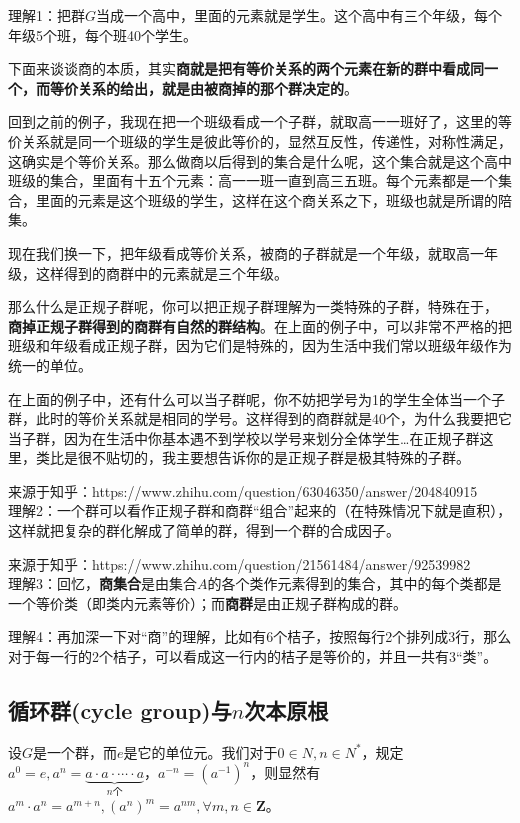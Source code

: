 \documentclass[12pt]{article}
\begin{document}
\begin{framed}
\small {
理解1：把群$G$当成一个高中，里面的元素就是学生。这个高中有三个年级，每个年级5个班，每个班40个学生。

下面来谈谈商的本质，其实\textbf{商就是把有等价关系的两个元素在新的群中看成同一个，而等价关系的给出，就是由被商掉的那个群决定的}。

回到之前的例子，我现在把一个班级看成一个子群，就取高一一班好了，这里的等价关系就是同一个班级的学生是彼此等价的，显然互反性，传递性，对称性满足，这确实是个等价关系。那么做商以后得到的集合是什么呢，这个集合就是这个高中班级的集合，里面有十五个元素：高一一班一直到高三五班。每个元素都是一个集合，里面的元素是这个班级的学生，这样在这个商关系之下，班级也就是所谓的陪集。

现在我们换一下，把年级看成等价关系，被商的子群就是一个年级，就取高一年级，这样得到的商群中的元素就是三个年级。

那么什么是正规子群呢，你可以把正规子群理解为一类特殊的子群，特殊在于，
\textbf{商掉正规子群得到的商群有自然的群结构}。在上面的例子中，可以非常不严格的把班级和年级看成正规子群，因为它们是特殊的，因为生活中我们常以班级年级作为统一的单位。

在上面的例子中，还有什么可以当子群呢，你不妨把学号为1的学生全体当一个子群，此时的等价关系就是相同的学号。这样得到的商群就是40个，为什么我要把它当子群，因为在生活中你基本遇不到学校以学号来划分全体学生…在正规子群这里，类比是很不贴切的，我主要想告诉你的是正规子群是极其特殊的子群。

来源于知乎：https://www.zhihu.com/question/63046350/answer/204840915
~\\

理解2：一个群可以看作正规子群和商群“组合”起来的（在特殊情况下就是直积），这样就把复杂的群化解成了简单的群，得到一个群的合成因子。

来源于知乎：https://www.zhihu.com/question/21561484/answer/92539982
~\\

理解3：回忆，\textbf{商集合}是由集合$A$的各个类作元素得到的集合，其中的每个类都是一个等价类（即类内元素等价）；而\textbf{商群}是由正规子群构成的群。

理解4：再加深一下对“商”的理解，比如有6个桔子，按照每行2个排列成3行，那么对于每一行的2个桔子，可以看成这一行内的桔子是等价的，并且一共有3“类”。
}
\end{framed}

\subsection{循环群(cycle group)与$n$次本原根}
设$G$是一个群，而$e$是它的单位元。我们对于$0 \in N, n \in N^*$，规定 $a^0 = e, a^n = \underbrace{a\cdot a \cdot \cdots \cdot a}_{n\text{个}}$，$a^{-n} = (a^{-1})^n$，则显然有$a^m \cdot a^n = a^{m+n}, (a^n)^m = a^{nm}, \forall m, n \in \mathbf{Z}$。
\end{document}
